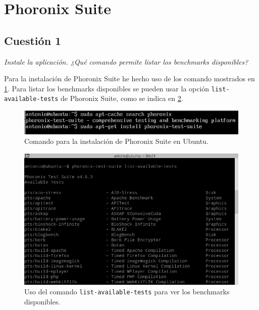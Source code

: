 



\maketitle %
\newpage %
\tableofcontents %
\listoffigures
\newpage

\section{Phoronix Suite}
\subsection{Cuestión 1}
\textit{Instale la aplicación. ¿Qué comando permite listar los benchmarks disponibles?}
\newline

 Para la instalación de Phoronix Suite he hecho uso de los comando mostrados en \cref{fig1}. Para listar los benchmarks disponibles se pueden usar la opción \texttt{list-available-tests}\cite{pho} de Phoronix Suite, como se indica en \cref{fig2}.
 
 \begin{figure}[H]
  \begin{center}
    \includegraphics[width=1\textwidth]{imagenes/pho1}
    \caption{Comando para la instalación de Phoronix Suite en Ubuntu.}
    \label{fig1}
  \end{center}
\end{figure}

\begin{figure}[H]
  \begin{center}
    \includegraphics[width=1\textwidth]{imagenes/pho2}
    \caption{Uso del comando \texttt{list-available-tests} para ver los benchmarks disponibles.}
    \label{fig2}
  \end{center}
\end{figure}

